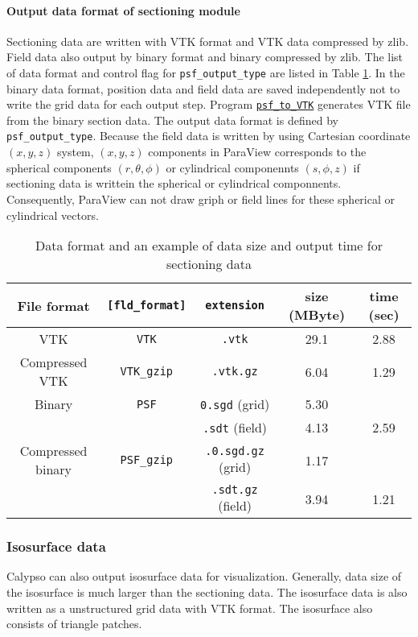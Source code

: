\paragraph{Output data format of sectioning module}
\label{sec:PSF_data}
Sectioning data are written with VTK format and VTK data compressed by zlib. Field data also output by binary format and binary compressed by zlib. The list of data format and control flag for \verb|psf_output_type| are listed in Table \ref{table:PSF_data}. In the binary data format, position data and field data are saved independently not to write the grid data for each output step. Program \hyperref[section:psf_to_VTK]{\tt psf\_to\_VTK} generates VTK file from the binary section data. The output data format is defined by \verb|psf_output_type|. Because the field data is written by using Cartesian coordinate $(x,y,z)$ system, $(x,y,z)$ components in ParaView corresponds to the spherical components $(r, \theta, \phi)$ or cylindrical componennts $(s,\phi, z)$ if sectioning data is writtein the spherical or cylindrical componnents. Consequently, ParaView can not draw griph or field lines for these spherical or cylindrical vectors.
%
\begin{table}[htp]
\caption{Data format  and an example of data size and output time  for sectioning data}
\label{table:PSF_data}
\begin{center} 
\begin{tabular}{|c|c|c|c|c|}
\hline
File format & \verb|[fld_format]| & \verb|extension| & size (MByte) & time (sec)  \\ \hline \hline
VTK & \verb|VTK| & \verb|.vtk| & 29.1 & 2.88 \\ \hline
Compressed VTK & \verb|VTK_gzip| & \verb|.vtk.gz| & 6.04 & 1.29 \\ \hline
Binary & \verb|PSF| & \verb|0.sgd| (grid) & 5.30 &  \\
           &        &  \verb|.sdt| (field) & 4.13 & 2.59 \\ \hline
Compressed binary & \verb|PSF_gzip| & \verb|.0.sgd.gz| (grid) & 1.17 & \\
           &        &  \verb|.sdt.gz| (field) & 3.94 & 1.21 \\ \hline
\end{tabular}
\end{center} 
\end{table} 

%
\subsubsection{Isosurface data}
\label{section:ISO}
%
Calypso can also output isosurface data for visualization. Generally, data size of the isosurface is much larger than the sectioning data. The isosurface data is also written as a unstructured grid data with VTK format. The isosurface also consists of triangle patches.

